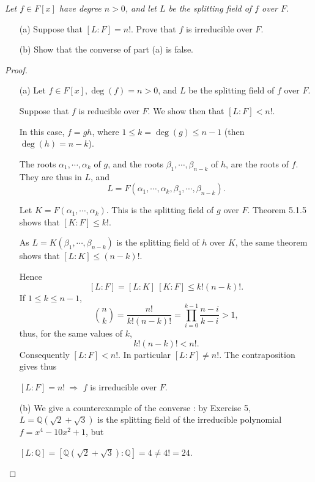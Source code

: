 \documentclass[11pt,a4paper]{article}
\newcommand{\Q}{\mathbb{Q}}
\begin{document}
{\it Let $f \in F[x]$ have degree $n>0$, and let $L$ be the splitting field of $f$ over $F$.
\begin{enumerate}
\item[(a)] Suppose that $[L:F] = n!$. Prove that $f$ is irreducible over $F$.
\item[(b)] Show that the converse of part (a) is false.
\end{enumerate}
}

\begin{proof}
\begin{enumerate}
\item[(a)]
Let $f \in F[x], \deg(f)=n>0$, and $L$ be the splitting field of $f$ over $F$.

Suppose that $f$ is reducible over $F$. We show then that $[L:F]<n!$.

In this case, $f =gh$, where $1\leq k = \deg(g) \leq n-1$ (then $\deg(h)=n-k$).

The roots $\alpha_1,\cdots,\alpha_k$ of $g$, and the roots $\beta_1,\cdots,\beta_{n-k}$ of $h$, are the roots of $f$. They are thus in $L$, and
$$L = F(\alpha_1,\cdots,\alpha_k,\beta_1,\cdots,\beta_{n-k}).$$

Let $K =  F(\alpha_1,\cdots,\alpha_k)$. This is the splitting field of $g$ over $F$. Theorem 5.1.5 shows that $[K:F] \leq k!$.

As $L = K(\beta_1,\cdots,\beta_{n-k})$ is the splitting field of $h$ over $K$, the same theorem shows that $[L : K] \leq (n-k)!$.

Hence
$$[L : F] = [L : K ]\ [K : F] \leq k!(n-k)!.$$
If $1\leq k \leq n-1$, $$\binom{n}{k} = \frac{n!}{k!(n-k)!} = \prod\limits_{i=0}^{k-1} \frac{n-i}{k-i} > 1,$$
thus, for the same values of $k$,
$$k!(n-k)! < n!.$$
Consequently $[L : F] < n!$. In particular $[L : F] \neq  n!$. The contraposition gives thus
\begin{center}
$[L : F] = n!\  \Rightarrow$ $f$ is irreducible over $F$.
\end{center}
\vspace{0.5cm}
\item[(b)]
We give a counterexample of the converse : by Exercise 5, $L = \Q(\sqrt{2}+\sqrt{3})$ is the splitting field of the irreducible polynomial $f = x^4-10x^2+1$, but 

$[L : \Q] = [\Q(\sqrt{2}+\sqrt{3}):\Q] = 4 \neq 4! = 24$.

\end{enumerate}
\end{proof}
\end{document}
